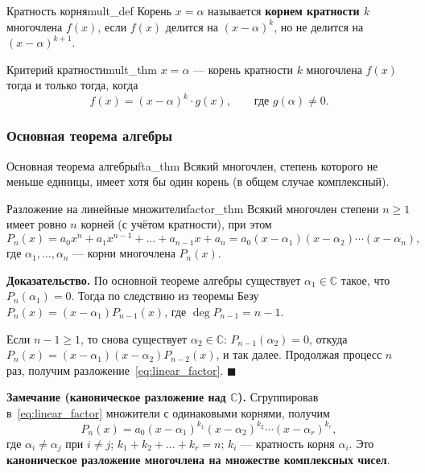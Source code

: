\documentclass[12pt,a4paper]{article}
\newenvironment{myproof}{\noindent\textbf{Доказательство.}}{\hfill$\blacksquare$}
\begin{document}
\begin{definition}{Кратность корня}{mult_def}
Корень $x = \alpha$ называется \textbf{корнем кратности $k$}
многочлена $f(x)$, если $f(x)$ делится на $(x - \alpha)^k$, но не
делится на $(x - \alpha)^{k+1}$.
\end{definition}

\begin{theorem}{Критерий кратности}{mult_thm}
$x = \alpha$ — корень кратности $k$ многочлена $f(x)$ тогда и только
тогда, когда
\[
f(x) = (x - \alpha)^k \cdot g(x), \qquad \text{где } g(\alpha) \neq 0.
\]
\end{theorem}

\subsubsection*{Основная теорема алгебры}

\begin{theorem}{Основная теорема алгебры}{fta_thm}
Всякий многочлен, степень которого не меньше единицы, имеет хотя бы
один корень (в общем случае комплексный).
\end{theorem}

\begin{theorem}{Разложение на линейные множители}{factor_thm}
Всякий многочлен степени $n \ge 1$ имеет ровно $n$ корней (с учётом
кратности), при этом
\begin{equation}
P_n(x) = a_0 x^n + a_1 x^{n-1} + \dots + a_{n-1} x + a_n
= a_0 (x - \alpha_1)(x - \alpha_2)\cdots(x - \alpha_n),
\label{eq:linear_factor}
\end{equation}
где $\alpha_1, \dots, \alpha_n$ — корни многочлена $P_n(x)$.
\end{theorem}

\begin{myproof}
По основной теореме алгебры существует $\alpha_1 \in \mathbb{C}$
такое, что $P_n(\alpha_1) = 0$. Тогда по следствию из теоремы Безу
$P_n(x) = (x - \alpha_1) P_{n-1}(x)$, где $\deg P_{n-1} = n - 1$.

Если $n - 1 \ge 1$, то снова существует $\alpha_2 \in \mathbb{C}$:
$P_{n-1}(\alpha_2) = 0$, откуда
$P_n(x) = (x - \alpha_1)(x - \alpha_2) P_{n-2}(x)$, и так далее.
Продолжая процесс $n$ раз, получим разложение~\eqref{eq:linear_factor}.
\end{myproof}

\noindent\textbf{Замечание (каноническое разложение над
$\mathbb{C}$).} Сгруппировав в~\eqref{eq:linear_factor} множители с
одинаковыми корнями, получим
\begin{equation}
P_n(x) = a_0 (x - \alpha_1)^{k_1}(x - \alpha_2)^{k_2}
\cdots (x - \alpha_r)^{k_r},
\label{eq:canonical_C}
\end{equation}
где $\alpha_i \neq \alpha_j$ при $i \neq j$;
$k_1 + k_2 + \dots + k_r = n$; $k_i$ — кратность корня $\alpha_i$.
Это \textbf{каноническое разложение многочлена на множестве
комплексных чисел}.
\end{document}
